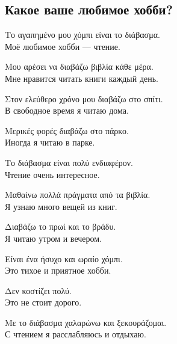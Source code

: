 \documentclass[12pt]{article}
\newcommand{\my}[1]{\textcolor{gray!80!white}{#1}}
\newenvironment{page}{\clearpage\normalsize\null\vfill}{\vfill\null}
\newenvironment{textblock}{\begin{minipage}{\textwidth}}{\end{minipage}\smallskip}
\begin{document}
	\begin{page}
		\subsection{Какое ваше любимое хобби?}
		\small
		\begin{textblock}
			Το αγαπημένο μου χόμπι είναι το διάβασμα.\\
			\my{Моё любимое хобби — чтение.}
			
			Μου αρέσει να διαβάζω βιβλία κάθε μέρα.\\
			\my{Мне нравится читать книги каждый день.}
			
			Στον ελεύθερο χρόνο μου διαβάζω στο σπίτι.\\
			\my{В свободное время я читаю дома.}
			
			Μερικές φορές διαβάζω στο πάρκο.\\
			\my{Иногда я читаю в парке.}
			
			Το διάβασμα είναι πολύ ενδιαφέρον.\\
			\my{Чтение очень интересное.}
			
			Μαθαίνω πολλά πράγματα από τα βιβλία.\\
			\my{Я узнаю много вещей из книг.}
			
			Διαβάζω το πρωί και το βράδυ.\\
			\my{Я читаю утром и вечером.}
			
			Είναι ένα ήσυχο και ωραίο χόμπι.\\
			\my{Это тихое и приятное хобби.}
			
			Δεν κοστίζει πολύ.\\
			\my{Это не стоит дорого.}
			
			Με το διάβασμα χαλαρώνω και ξεκουράζομαι.\\
			\my{С чтением я расслабляюсь и отдыхаю.}
		\end{textblock}
	\end{page}
	
\end{document}
